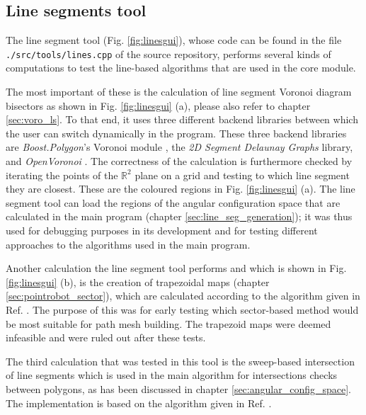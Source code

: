 \subsection{Line segments tool}
\label{sec:tests_linesegs}
The line segment tool (Fig. \ref{fig:linesgui}), whose code can be found in the file 
\lstinline|./src/tools/lines.cpp| of the source repository, 
performs several kinds of computations to test the line-based algorithms that are used in the core module.

The most important of these is the calculation of line segment Voronoi diagram bisectors as shown in 
Fig. \ref{fig:linesgui} (a), please also refer to chapter \ref{sec:voro_ls}.
To that end, it uses three different backend libraries between which the user can switch dynamically in
the program. These three backend libraries are \textit{Boost.Polygon}'s Voronoi module \cite{web_boost_polygon_voronoi},
the \textit{2D Segment Delaunay Graphs} \cite{web_2dsegdel} library, and \textit{OpenVoronoi} \cite{web_openvoronoi}.
The correctness of the calculation is furthermore checked by iterating the points of the $\mathbb{R}^2$ plane
on a grid and testing to which line segment they are closest. These are the coloured regions in Fig. \ref{fig:linesgui} (a).
The line segment tool can load the regions of the angular configuration space that are calculated in the main
program (chapter \ref{sec:line_seg_generation}); it was thus used for debugging purposes in its development and
for testing different approaches to the algorithms used in the main program.

Another calculation the line segment tool performs and which is shown in Fig. \ref{fig:linesgui} (b), is the 
creation of trapezoidal maps (chapter \ref{sec:pointrobot_sector}), which are calculated according to the 
algorithm given in Ref. \cite[Ch. 6, pp. 121-146]{Berg2008}.
The purpose of this was for early testing which sector-based method would be most suitable
for path mesh building. The trapezoid maps were deemed infeasible and were ruled out after
these tests.

The third calculation that was tested in this tool is the sweep-based intersection of line segments which
is used in the main algorithm for intersections checks between polygons, as has been discussed in 
chapter \ref{sec:angular_config_space}.
The implementation is based on the algorithm given in Ref. \cite[Ch. 2, pp. 69-80]{FUH_geo2020}.

